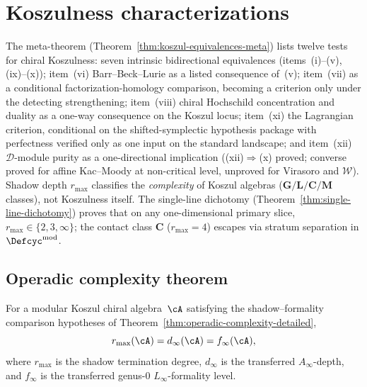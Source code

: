 
\section{Koszulness characterizations}
\label{sec:concordance-koszulness-theory}

The meta-theorem (Theorem~\ref{thm:koszul-equivalences-meta}) lists
twelve tests for chiral Koszulness: seven intrinsic bidirectional
equivalences (items~(i)--(v), (ix)--(x)); item~(vi)
Barr--Beck--Lurie as a listed consequence of~(v); item~(vii) as a
conditional factorization-homology comparison, becoming a criterion
only under the detecting strengthening; item~(viii) chiral Hochschild
concentration and duality as a one-way consequence on the Koszul
locus; item~(xi) the Lagrangian criterion, conditional on the
shifted-symplectic hypothesis package with perfectness verified only
as one input on the standard landscape; and item~(xii)
$\mathcal{D}$-module purity as a one-directional implication
((xii)$\Rightarrow$(x) proved; converse proved for affine
Kac--Moody at non-critical level, unproved for Virasoro and
$\mathcal{W}$).
Shadow depth $r_{\max}$ classifies the \emph{complexity} of Koszul
algebras ($\mathbf{G}/\mathbf{L}/\mathbf{C}/\mathbf{M}$ classes),
not Koszulness itself. The single-line dichotomy
(Theorem~\ref{thm:single-line-dichotomy}) proves that on any
one-dimensional primary slice, $r_{\max} \in \{2, 3, \infty\}$;
the contact class $\mathbf{C}$ ($r_{\max} = 4$) escapes via stratum
separation in $\Defcyc^{\mathrm{mod}}$.

\subsection{Operadic complexity theorem}
\label{subsec:concordance-operadic-complexity}

\begin{theorem}
\label{thm:operadic-complexity}
For a modular Koszul chiral algebra~$\cA$ satisfying the
shadow--formality comparison hypotheses of
Theorem~\ref{thm:operadic-complexity-detailed},
\[
r_{\max}(\cA)=d_\infty(\cA)=f_\infty(\cA),
\]
where $r_{\max}$ is the shadow termination degree, $d_\infty$
is the transferred $A_\infty$-depth, and $f_\infty$ is the
transferred genus-$0$ $L_\infty$-formality level.
\end{theorem}

